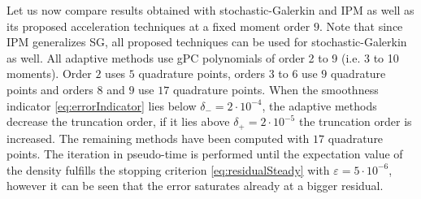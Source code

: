 Let us now compare results obtained with stochastic-Galerkin and IPM as well as its proposed acceleration techniques at a fixed moment order $9$. Note that since IPM generalizes SG, all proposed techniques can be used for stochastic-Galerkin as well. All adaptive methods use gPC polynomials of order 2 to 9 (i.e. 3 to 10 moments). Order $2$ uses $5$ quadrature points, orders $3$ to $6$ use $9$ quadrature points and orders $8$ and $9$ use $17$ quadrature points. When the smoothness indicator \eqref{eq:errorIndicator} lies below $\delta_{-} = 2\cdot 10^{-4}$, the adaptive methods decrease the truncation order, if it lies above $\delta_{+} = 2\cdot 10^{-5}$ the truncation order is increased. The remaining methods have been computed with $17$ quadrature points. The iteration in pseudo-time is performed until the expectation value of the density fulfills the stopping criterion \eqref{eq:residualSteady} with $\varepsilon = 5\cdot 10^{-6}$, however it can be seen that the error saturates already at a bigger residual.

